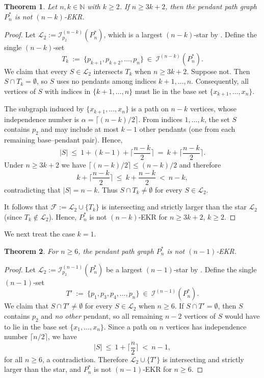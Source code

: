 \documentclass{article}
\newtheorem{theorem}{Theorem}
\theoremstyle{definition}
\newcommand{\1}{\mathbf{1}}
\begin{document}
\bigskip

\begin{theorem}\label{notEKR1}
Let $n,k\in\mathbb{N}$ with $k\ge 2$. If $n\ge 3k+2$, then the pendant path graph $P_n^*$ is \emph{not} $(n-k)$‑EKR.
\end{theorem}

\begin{proof}
Let $\mathcal{L}_2:=\mathcal{I}^{(n-k)}_{p_2}(P_n^*)$, which is a largest $(n-k)$‑star by \cite[Theorem ~5]{DeSilvaDDH2023}.  Define the single $(n-k)$‑set
\[
T_k\ :=\ \{p_{k+1},p_{k+2},\dots,p_n\}\ \in\ \mathcal{I}^{(n-k)}(P_n^*).
\]
We claim that every $S\in\mathcal{L}_2$ intersects $T_k$ when $n\ge 3k+2$. Suppose not. Then $S\cap T_k=\emptyset$, so $S$ uses no pendants among indices $k+1,\dots,n$. Consequently, all vertices of $S$ with indices in $\{k+1,\dots,n\}$ must lie in the base set $\{x_{k+1},\dots,x_n\}$.

The subgraph induced by $\{x_{k+1},\dots,x_n\}$ is a path on $n-k$ vertices, whose independence number is $\alpha=\lceil (n-k)/2\rceil$. From indices $1,\dots,k$, the set $S$ contains $p_2$ and may include at most $k-1$ other pendants (one from each remaining base–pendant pair). Hence,
\[
|S|\ \le\ 1+(k-1)+\Big\lceil\frac{n-k}{2}\Big\rceil\ =\ k+\Big\lceil\frac{n-k}{2}\Big\rceil.
\]
Under $n\ge 3k+2$ we have $\lceil (n-k)/2\rceil\le (n-k)/2$ and therefore
\[
k+\Big\lceil\frac{n-k}{2}\Big\rceil\ \le\ k+\frac{n-k}{2}\ <\ n-k,
\]
contradicting that $|S|=n-k$. Thus $S\cap T_k\neq\emptyset$ for every $S\in\mathcal{L}_2$.

It follows that $\mathcal{F}:=\mathcal{L}_2\cup\{T_k\}$ is intersecting and strictly larger than the star $\mathcal{L}_2$ (since $T_k\notin\mathcal{L}_2$). Hence, $P_n^*$ is not $(n-k)$‑EKR for $n\ge 3k+2$, $k\ge 2$.
\end{proof}

\medskip

We next treat the case $k=1$.

\begin{theorem}\label{notEKR2}
For $n\ge 6$, the pendant path graph $P_n^*$ is \emph{not} $(n-1)$‑EKR.
\end{theorem}

\begin{proof}
Let $\mathcal{L}_2:=\mathcal{I}^{(n-1)}_{p_2}(P_n^*)$ be a largest $(n-1)$‑star by \cite[Thm.~5]{DeSilvaDDH2023}. Define the single $(n-1)$‑set
\[
T'\ :=\ \{p_1,p_3,p_4,\dots,p_n\}\ \in\ \mathcal{I}^{(n-1)}(P_n^*).
\]
We claim that $S\cap T'\neq\emptyset$ for every $S\in\mathcal{L}_2$ when $n\ge 6$. If $S\cap T'=\emptyset$, then $S$ contains $p_2$ and \emph{no other} pendant, so all remaining $n-2$ vertices of $S$ would have to lie in the base set $\{x_1,\dots,x_n\}$. Since a path on $n$ vertices has independence number $\lceil n/2\rceil$, we have
\[
|S|\ \le\ 1+\Big\lceil\frac{n}{2}\Big\rceil\ <\ n-1,
\]
for all $n \ge 6$, a contradiction. Therefore $\mathcal{L}_2\cup\{T'\}$ is intersecting and strictly larger than the star, and $P_n^*$ is not $(n-1)$‑EKR for $n\ge 6$.
\end{proof}
\end{document}
